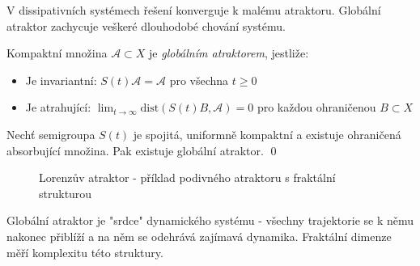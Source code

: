 \begin{motivation}
V dissipativních systémech řešení konverguje k malému atraktoru. Globální atraktor zachycuje veškeré dlouhodobé chování systému.
\end{motivation}

\begin{definition}
Kompaktní množina $\mathcal{A} \subset X$ je \emph{globálním atraktorem}, jestliže:
\begin{itemize}
\item Je invariantní: $S(t)\mathcal{A} = \mathcal{A}$ pro všechna $t \geq 0$
\item Je atrahující: $\lim_{t\to\infty} \text{dist}(S(t)B, \mathcal{A}) = 0$ pro každou ohraničenou $B \subset X$
\end{itemize}
\end{definition}

\begin{theorem}
Nechť semigroupa $S(t)$ je spojitá, uniformně kompaktní a existuje ohraničená absorbující množina. Pak existuje globální atraktor.
\qed
\end{theorem}

\begin{figure}[h]
\centering
{}
\caption{Lorenzův atraktor - příklad podivného atraktoru s fraktální strukturou}
\label{fig:lorenz-attractor}
\end{figure}

\begin{intuition}
Globální atraktor je "srdce" dynamického systému - všechny trajektorie se k němu nakonec přiblíží a na něm se odehrává zajímavá dynamika. Fraktální dimenze měří komplexitu této struktury.
\end{intuition}

